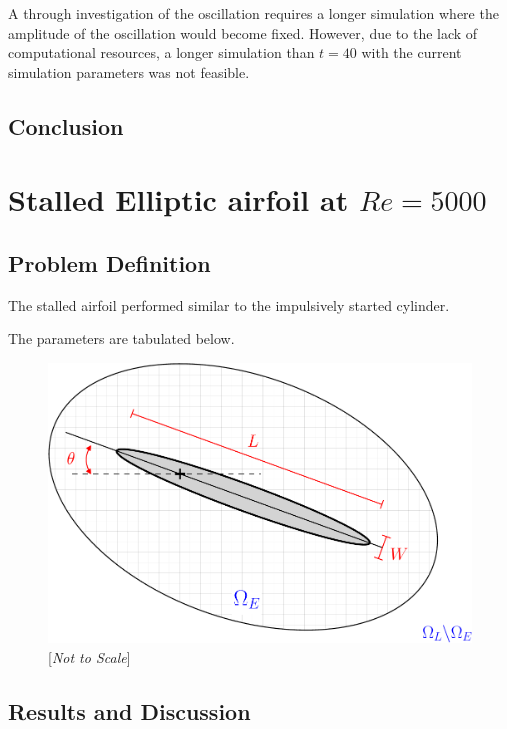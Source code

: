 A through investigation of the oscillation requires a longer simulation where the amplitude of the oscillation would become fixed. However, due to the lack of computational resources, a longer simulation than $t=40$ with the current simulation parameters was not feasible.
	
	
	
\subsection{Conclusion}	


\section{Stalled Elliptic airfoil at $Re=5000$}

\subsection{Problem Definition}

The stalled airfoil performed similar to the impulsively started cylinder.

The parameters are tabulated below.

	\begin{figure}[!h]
	\showthe\columnwidth
	\centering
	\includegraphics[width=0.6\linewidth]{./figures/hybrid/ellipse/hellipticAirfoil_dd-crop.pdf}
	\caption{[\textit{Not to Scale}] }
	\label{fig:hellipticAirfoil_dd-crop}
	\end{figure}

\subsection{Results and Discussion}


